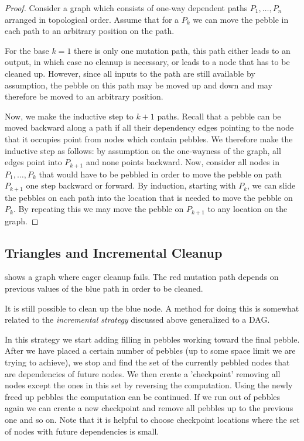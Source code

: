 \begin{proof}

Consider a graph which consists of one-way dependent paths $P_1,\dotsc,P_n$
arranged in topological order. Assume that for a $P_k$ we can move the pebble
in each path to an arbitrary position on the path.

For the base $k=1$ there is only one mutation path, this path either leads to
an output, in which case no cleanup is necessary, or leads to a node that has
to be cleaned up. However, since all inputs to the path are still available by
assumption, the pebble on this path may be moved up and down and may therefore
be moved to an arbitrary position.

Now, we make the inductive step to $k+1$ paths. Recall that a pebble can be
moved backward along a path if all their dependency edges pointing to the node
that it occupies point from nodes which contain pebbles. We therefore make the
inductive step as follows: by assumption on the one-wayness of the graph, all
edges point into $P_{k+1}$ and none points backward. Now, consider all nodes in
$P_1, \ldots, P_k$ that would have to be pebbled in order to move the pebble on
path $P_{k+1}$ one step backward or forward. By induction, starting with $P_k$,
we can slide the pebbles on each path into the location that is needed to move
the pebble on $P_k$. By repeating this we may move the pebble on $P_{k+1}$ to
any location on the graph.

\end{proof}

\subsection{Triangles and Incremental Cleanup}

 shows a graph where eager cleanup fails. The red mutation
path depends on previous values of the blue path in order to be cleaned.

It is still possible to clean up the blue node. A method for doing this is
somewhat related to the \emph{incremental strategy} discussed above generalized
to a DAG.

In this strategy we start adding filling in pebbles working toward the final
pebble. After we have placed a certain number of pebbles (up to some space
limit we are trying to achieve), we stop and find the set of the currently
pebbled nodes that are dependencies of future nodes. We then create a
'checkpoint' removing all nodes except the ones in this set by reversing the
computation.  Using the newly freed up pebbles the computation can be
continued.  If we run out of pebbles again we can create a new checkpoint and
remove all pebbles up to the previous one and so on. Note that it is helpful to
choose checkpoint locations where the set of nodes with future dependencies is
small.

